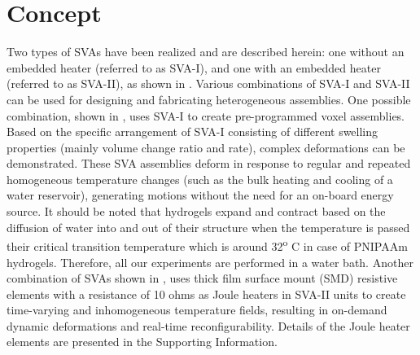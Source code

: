 \section{Concept}
Two types of SVAs have been realized and are described herein: one without an embedded heater (referred to as SVA-I), and one with an embedded heater (referred to as SVA-II), as shown in . 
Various combinations of SVA-I and SVA-II can be used for designing and fabricating heterogeneous assemblies. 
One possible combination, shown in , uses SVA-I to create pre-programmed voxel assemblies. Based on the specific arrangement of SVA-I consisting of different swelling properties (mainly volume change ratio and rate), complex deformations can be demonstrated. These SVA assemblies deform in response to regular and repeated homogeneous temperature changes (such as the bulk heating and cooling of a water reservoir), generating motions without the need for an on-board energy source. It should be noted that hydrogels expand and contract based on the diffusion of water into and out of their structure when the temperature is passed their critical transition temperature which is around 32\textsuperscript{o} C in case of PNIPAAm hydrogels. Therefore, all our experiments are performed in a water bath. Another combination of SVAs shown in , uses thick film surface mount (SMD) resistive elements with a resistance of 10 ohms as Joule heaters in SVA-II units to create time-varying and inhomogeneous temperature fields, resulting in on-demand dynamic deformations and real-time reconfigurability. Details of the Joule heater elements are presented in the Supporting Information.\\ 


